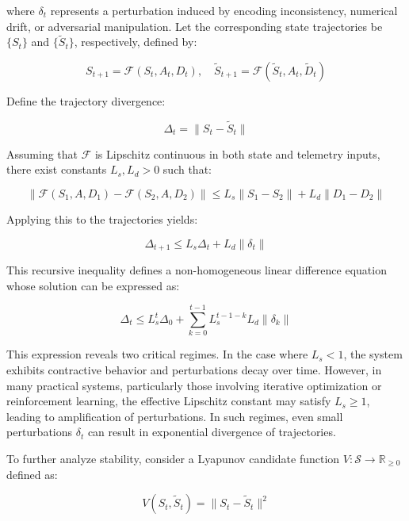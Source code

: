 where $\delta_t$ represents a perturbation induced by encoding inconsistency, numerical drift, or adversarial manipulation. Let the corresponding state trajectories be $\{S_t\}$ and $\{\tilde{S}_t\}$, respectively, defined by:

\begin{equation}
S_{t+1} = \mathcal{F}(S_t, A_t, D_t), \quad \tilde{S}_{t+1} = \mathcal{F}(\tilde{S}_t, A_t, \tilde{D}_t)
\end{equation}

Define the trajectory divergence:

\begin{equation}
\Delta_t = \| S_t - \tilde{S}_t \|
\end{equation}

Assuming that $\mathcal{F}$ is Lipschitz continuous in both state and telemetry inputs, there exist constants $L_s, L_d > 0$ such that:

\begin{equation}
\|\mathcal{F}(S_1, A, D_1) - \mathcal{F}(S_2, A, D_2)\| \leq L_s \|S_1 - S_2\| + L_d \|D_1 - D_2\|
\end{equation}

Applying this to the trajectories yields:

\begin{equation}
\Delta_{t+1} \leq L_s \Delta_t + L_d \|\delta_t\|
\end{equation}

This recursive inequality defines a non-homogeneous linear difference equation whose solution can be expressed as:

\begin{equation}
\Delta_t \leq L_s^t \Delta_0 + \sum_{k=0}^{t-1} L_s^{t-1-k} L_d \|\delta_k\|
\end{equation}

This expression reveals two critical regimes. In the case where $L_s < 1$, the system exhibits contractive behavior and perturbations decay over time. However, in many practical systems, particularly those involving iterative optimization or reinforcement learning, the effective Lipschitz constant may satisfy $L_s \geq 1$, leading to amplification of perturbations. In such regimes, even small perturbations $\delta_t$ can result in exponential divergence of trajectories.

To further analyze stability, consider a Lyapunov candidate function $V: \mathcal{S} \rightarrow \mathbb{R}_{\geq 0}$ defined as:

\begin{equation}
V(S_t, \tilde{S}_t) = \|S_t - \tilde{S}_t\|^2
\end{equation}

